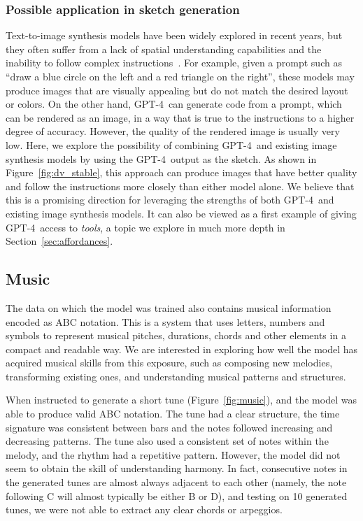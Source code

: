 \subsubsection{Possible application in sketch generation} Text-to-image synthesis models have been widely explored in recent years, but they often suffer from a lack of spatial understanding capabilities and the inability to follow complex instructions~\cite{gokhale2022benchmarking}. For example, given a prompt such as ``draw a blue circle on the left and a red triangle on the right'', these models may produce images that are visually appealing but do not match the desired layout or colors. On the other hand, GPT-4\ can generate code from a prompt, which can be rendered as an image, in a way that is true to the instructions to a higher degree of accuracy. However, the quality of the rendered image is usually very low. Here, we explore the possibility of combining GPT-4\ and existing image synthesis models by using the GPT-4\ output as the sketch. As shown in Figure~\ref{fig:dv_stable}, this approach can produce images that have better quality and follow the instructions more closely than either model alone. We believe that this is a promising direction for leveraging the strengths of both GPT-4\ and existing image synthesis models. It can also be viewed as a first example of giving GPT-4\ access to {\em tools}, a topic we explore in much more depth in Section~\ref{sec:affordances}.

\subsection{Music} \label{sec:music}
The data on which the model was trained also contains musical information encoded as ABC notation. This is a system that uses letters, numbers and symbols to represent musical pitches, durations, chords and other elements in a compact and readable way. We are interested in exploring how well the model has acquired musical skills from this exposure, such as composing new melodies, transforming existing ones, and understanding musical patterns and structures.

When instructed to generate a short tune (Figure~\ref{fig:music}), and the model was able to produce valid ABC notation. The tune had a clear structure, the time signature was consistent between bars and the notes followed increasing and decreasing patterns. The tune also used a consistent set of notes within the melody, and the rhythm had a repetitive pattern. However, the model did not seem to obtain the skill of understanding harmony. In fact, consecutive notes in the generated tunes are almost always adjacent to each other (namely, the note following C will almost typically be either B or D), and testing on 10 generated tunes, we were not able to extract any clear chords or arpeggios.

